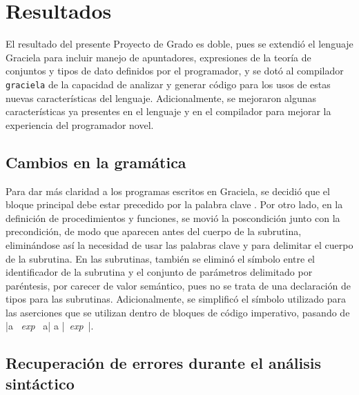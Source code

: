 \chapter{Resultados}
\label{capitulo4}


El resultado del presente Proyecto de Grado es doble, pues se extendió el
lenguaje Graciela para incluir manejo de apuntadores, expresiones de la teoría
de conjuntos y tipos de dato definidos por el programador, y se dotó al
compilador \texttt{graciela} de la capacidad de analizar y generar código para
los usos de estas nuevas características del lenguaje. Adicionalmente, se
mejoraron algunas características ya presentes en el lenguaje y en el compilador
para mejorar la experiencia del programador novel.

\section{Cambios en la gramática}

Para dar más claridad a los programas escritos en Graciela, se decidió que el
bloque principal debe estar precedido por la palabra clave . Por
otro lado, en la definición de procedimientos y funciones, se movió la
poscondición junto con la precondición, de modo que aparecen antes del cuerpo de
la subrutina, eliminándose así la necesidad de usar las palabras clave
 y  para delimitar el cuerpo de la subrutina. En las
subrutinas, también se eliminó el  símbolo \ingra{:} entre el identificador de
la subrutina y el conjunto de parámetros delimitado por paréntesis, por carecer
de valor semántico, pues no se trata de una declaración de tipos para las
subrutinas. Adicionalmente, se simplificó el símbolo utilizado para las
aserciones que se utilizan dentro de bloques de código imperativo, pasando de
\ingra|{a ~\textit{exp}~ a}| a \ingra|{~\textit{exp}~}|.

\section{Recuperación de errores durante el análisis sintáctico}

